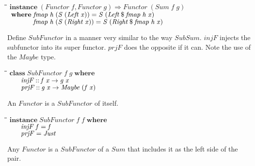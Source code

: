 \documentclass[10pt]{article}
\newlength{\lwidth}\setlength{\lwidth}{4.5cm}
\newlength{\cwidth}\setlength{\cwidth}{8mm} %
\newcommand{\Conid}[1]{\mathit{#1}}
\newcommand{\Varid}[1]{\mathit{#1}}
\begin{document}
\begin{tabbing}
\qquad\=\hspace{\lwidth}\=\hspace{\cwidth}\=\+\kill
${\mathbf{instance}\;(\Conid{Functor}\;\Varid{f},\Conid{Functor}\;\Varid{g})\Rightarrow \Conid{Functor}\;(\Conid{Sum}\;\Varid{f}\;\Varid{g})}$\\
${\hskip0.50em\relax\mathbf{where}\;\Varid{fmap}\;\Varid{h}\;(\Conid{S}\;(\Conid{Left}\;\Varid{x}))\mathrel{=}\Conid{S}\;(\Conid{Left}\mathbin{\$}\Varid{fmap}\;\Varid{h}\;\Varid{x})}$\\
${\hskip0.50em\relax\phantom{\mathbf{where}\;\mbox{}}\Varid{fmap}\;\Varid{h}\;(\Conid{S}\;(\Conid{Right}\;\Varid{x}))\mathrel{=}\Conid{S}\;(\Conid{Right}\mathbin{\$}\Varid{fmap}\;\Varid{h}\;\Varid{x})}$
\end{tabbing}
Define \ensuremath{\Conid{SubFunctor}} in a manner very similar to the way \ensuremath{\Conid{SubSum}}.
\ensuremath{\Varid{injF}} injects the subfunctor into its super functor.  \ensuremath{\Varid{prjF}} does the
opposite if it can.  Note the use of the \ensuremath{\Conid{Maybe}} type.

\begin{tabbing}
\qquad\=\hspace{\lwidth}\=\hspace{\cwidth}\=\+\kill
${\mathbf{class}\;\Conid{SubFunctor}\;\Varid{f}\;\Varid{g}\;\mathbf{where}}$\\
${\hskip2.00em\relax\Varid{injF}\mathbin{::}\Varid{f}\;\Varid{x}\to \Varid{g}\;\Varid{x}}$\\
${\hskip2.00em\relax\Varid{prjF}\mathbin{::}\Varid{g}\;\Varid{x}\to \Conid{Maybe}\;(\Varid{f}\;\Varid{x})}$
\end{tabbing}
An \ensuremath{\Conid{Functor}} is a \ensuremath{\Conid{SubFunctor}} of itself.

\begin{tabbing}
\qquad\=\hspace{\lwidth}\=\hspace{\cwidth}\=\+\kill
${\mathbf{instance}\;\Conid{SubFunctor}\;\Varid{f}\;\Varid{f}\;\mathbf{where}}$\\
${\hskip2.00em\relax\Varid{injF}\;\Varid{f}\mathrel{=}\Varid{f}}$\\
${\hskip2.00em\relax\Varid{prjF}\mathrel{=}\Conid{Just}}$
\end{tabbing}
Any \ensuremath{\Conid{Functor}} is a \ensuremath{\Conid{SubFunctor}} of a \ensuremath{\Conid{Sum}} that includes it as the
left side of the pair.
\end{document}
